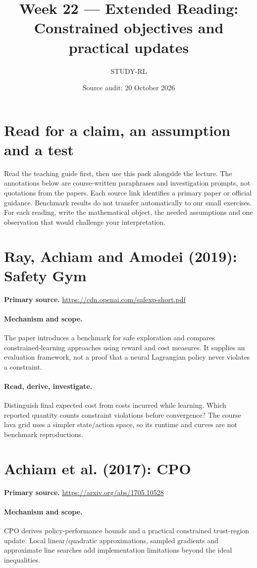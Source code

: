 \documentclass[11pt]{scrartcl}
\title{Week 22 --- Extended Reading: Constrained objectives and practical updates}
\author{STUDY-RL}
\date{Source audit: 20 October 2026}
\begin{document}
\maketitle
\section*{Read for a claim, an assumption and a test}
Read the teaching guide first, then use this pack alongside the lecture.
The annotations below are course-written paraphrases and investigation prompts,
not quotations from the papers. Each source link identifies a primary paper
or official guidance. Benchmark results do not transfer automatically to our
small exercises. For each reading, write the mathematical object, the needed
assumptions and one observation that would challenge your interpretation.

\section{Ray, Achiam and Amodei (2019): Safety Gym}
\noindent\textbf{Primary source.} \url{https://cdn.openai.com/safexp-short.pdf}

\paragraph{Mechanism and scope.} The paper introduces a benchmark for safe exploration and compares constrained-learning approaches using reward and cost measures. It supplies an evaluation framework, not a proof that a neural Lagrangian policy never violates a constraint.

\paragraph{Read, derive, investigate.} Distinguish final expected cost from costs incurred while learning. Which reported quantity counts constraint violations before convergence? The course lava grid uses a simpler state/action space, so its runtime and curves are not benchmark reproductions.

\section{Achiam et al. (2017): CPO}
\noindent\textbf{Primary source.} \url{https://arxiv.org/abs/1705.10528}

\paragraph{Mechanism and scope.} CPO derives policy-performance bounds and a practical constrained trust-region update. Local linear/quadratic approximations, sampled gradients and approximate line searches add implementation limitations beyond the ideal inequalities.
\end{document}
